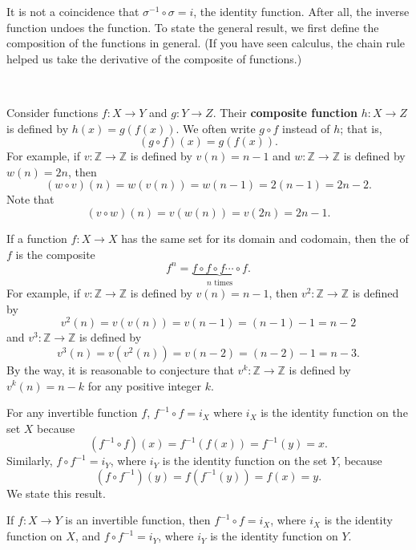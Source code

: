 It is not a coincidence that $\sigma^{-1} \circ \sigma = i$, the identity function.  After all, the inverse function undoes the function. To state the general result, we first define the composition of the functions in general.  (If you have seen calculus, the chain rule helped us take the derivative of the composite of functions.)

\begin{defn}
\label{defn_fn_composition}
~
    \begin{apart}
        \item Consider functions $f: X \to Y$ and $g: Y \to Z$. Their \textbf{composite function} $h: X \to Z$ is defined by $h(x) = g(f(x))$.  We often write $g \circ f$ instead of $h$; that is, $$(g \circ f)(x) = g(f(x)).$$  For example, if $v: \mathbb{Z} \to \mathbb{Z}$ is defined by $v(n) = n-1$ and $w: \mathbb{Z} \to \mathbb{Z}$ is defined by $w(n) = 2n$, then $$(w \circ v)(n) = w(v(n)) = w(n-1) = 2(n-1) = 2n-2.$$
        Note that $$(v \circ w)(n) = v(w(n)) = v(2n) = 2n-1.$$

        \item If a function $f:X \to X$ has the same set for its domain and codomain, then the  of $f$ is the composite $$f^n=\underbrace{f \circ f \circ f \cdots \circ f}_{n \text{ times}}.$$
        For example, if $v: \mathbb{Z} \to \mathbb{Z}$ is defined by $v(n) = n-1$, then $v^2: \mathbb{Z} \to \mathbb {Z}$ is defined by 
            $$v^2(n) = v(v(n))=v(n-1) = (n-1)-1 = n-2$$ 
        and $v^3: \mathbb{Z} \to \mathbb {Z}$ is defined by 
            $$v^3(n) = v(v^2(n)) = v(n-2) = (n-2)-1 = n-3.$$
        By the way, it is reasonable to conjecture that $v^k: \mathbb{Z} \to \mathbb {Z}$ is defined by $v^k(n) = n-k$ for any positive integer $k$.
    \end{apart} 
\end{defn}

For any invertible function $f$, $f^{-1} \circ f=i_X$ where $i_X$ is the identity function on the set $X$ because $$(f^{-1} \circ f)(x)=f^{-1}(f(x)) = f^{-1}(y) = x.$$ Similarly, $f \circ f^{-1}=i_Y$, where $i_Y$ is the identity function on the set $Y$, because
$$(f \circ f^{-1})(y) = f(f^{-1}(y)) = f(x) = y.$$ 
We state this result.

\begin{thm}
\label{thm_inv_fn_comp}
    If $f:X \to Y$ is an invertible function, then $f^{-1} \circ f=i_X$, where $i_X$ is the identity function on $X$, and $f \circ f^{-1}=i_Y$, where $i_Y$ is the identity function on $Y$.
\end{thm}

